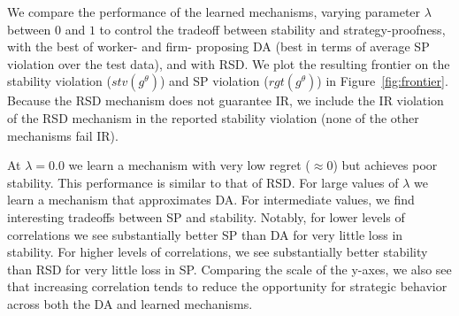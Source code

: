 \documentclass[11pt,letterpaper]{article}
\theoremstyle{definition}
\begin{document}
We compare the performance of the learned  mechanisms,  varying parameter $\lambda$ between $0$ and $1$ to control the tradeoff between stability and strategy-proofness, with the best of worker- and firm- proposing DA (best in terms of average SP violation over the test data), and with RSD.
%
%
%
We plot the resulting frontier on the stability violation ($\mathit{stv}(g^\theta)$) and  SP violation ($\mathit{rgt}(g^\theta)$) in Figure~\ref{fig:frontier}. Because the RSD mechanism does not  guarantee IR,   we include the IR violation of the RSD mechanism in the reported stability violation (none of the other mechanisms fail IR). 

At $\lambda = 0.0$ we learn a mechanism with very low regret ($\approx0$) but achieves  poor stability. This performance is similar to that of RSD. 
For large values of $\lambda$ we learn a mechanism that approximates DA. For intermediate values, we find interesting tradeoffs between SP and stability. Notably, for lower levels of correlations we see substantially better SP than DA for very little loss in stability. For higher levels of correlations, we see substantially better stability than RSD for very little loss in SP. 
%
%
Comparing the scale of the y-axes, we also see that increasing correlation tends to reduce the opportunity for strategic behavior across both the DA and learned mechanisms.
%

\end{document}
